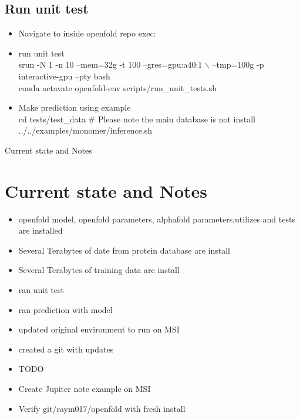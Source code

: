 \documentclass[xcolor = svgnames,hyperref = {colorlinks = true},]{beamer}
\newcommand{\sectframe}[1]{\begin{frame}{#1}
		\section{#1}
}
\begin{document}
\subsection{Run unit test}
\begin{frame}[fragile]
	\begin{tcolorbox}[colback=blue!5!white,colframe=blue!75!black]
	\begin{itemize}{}
			\item{Navigate to inside openfold repo exec:}
			\item{run unit test}\\
srun -N 1 -n 10 --mem=32g -t 100 --gres=gpu:a40:1 $\backslash$
--tmp=100g -p interactive-gpu --pty bash\\
conda actavate openfold-env
scripts/run\_unit\_tests.sh
			\item{Make prediction using example}\\
cd tests/test\_data
\# Please note the main database is not install\\
../../examples/monomer/inference.sh
		\end{itemize}
	\end{tcolorbox}
\end{frame}

\sectframe{Current state and Notes}
	\begin{tcolorbox}[colback=blue!5!white,colframe=blue!75!black]
		\begin{itemize}{}
			\item{openfold model, openfold parameters, alphafold parameters,utilizes and
			tests are installed}
			\item{Several Terabytes of date from protein database are install}
			\item{Several Terabytes of training data are install}\\
			\item{ran unit test}
			\item{ran prediction with model}
			\item{updated original environment to run on MSI}
			\item{created a git with updates}
			\item{TODO}
			\item{Create Jupiter note example on MSI}
			\item{Verify git/raym017/openfold with fresh install}
		\end{itemize}
	\end{tcolorbox}
\end{frame}
\end{document}
